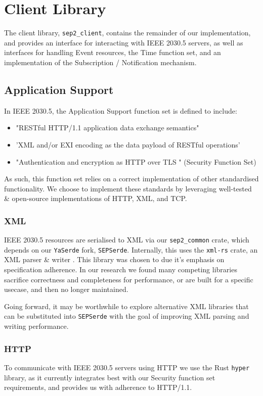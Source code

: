 \section{Client Library}
The client library, \texttt{sep2\_client}, contains the remainder of our implementation, and provides an interface for interacting with IEEE 2030.5 servers, as well as interfaces for handling Event resources, the Time function set, and an implementation of the Subscription / Notification mechanism. 

\subsection{Application Support}
In IEEE 2030.5, the Application Support function set is defined to include: \cite{2030}

\begin{itemize}
    \item "RESTful HTTP/1.1 application data exchange semantics"
    \item 'XML and/or EXI encoding as the data payload of RESTful operations'
    \item "Authentication and encryption as HTTP over TLS " (Security Function Set)
\end{itemize}

As such, this function set relies on a correct implementation of other standardised functionality. We choose to implement these standards by leveraging well-tested \& open-source implementations of HTTP, XML, and TCP.

\subsubsection{XML}
IEEE 2030.5 resources are serialised to XML via our \texttt{sep2\_common} crate, which depends on our \texttt{YaSerde} fork, \texttt{SEPSerde}. Internally, this uses the \texttt{xml-rs} crate, an XML parser \& writer \cite{xmlrs}. This library was chosen to due it's emphasis on specification adherence. In our research we found many competing libraries sacrifice correctness and completeness for performance, or are built for a specific usecase, and then no longer maintained. \cite{xmlrsperformance}

Going forward, it may be worthwhile to explore alternative XML libraries that can be substituted into \texttt{SEPSerde} with the goal of improving XML parsing and writing performance. 

\subsubsection{HTTP}
To communicate with IEEE 2030.5 servers using HTTP we use the Rust \texttt{hyper} library, as it currently integrates best with our Security function set requirements, and provides us with adherence to HTTP/1.1. \cite{hyper}

